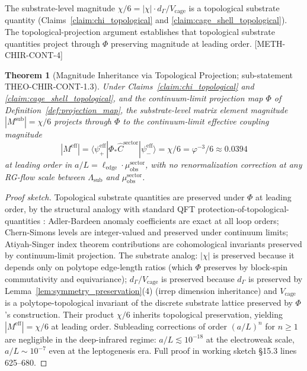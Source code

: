 \documentclass[11pt,letterpaper]{article}
\newtheorem{theorem}{Theorem}[section]
\newcommand{\Phicont}{\Phi_*}
\newcommand{\Lambdasub}{\Lambda_{\text{sub}}}
\newcommand{\muobs}{\mu_{\text{obs}}}
\newcommand{\elledge}{\ell_{\text{edge}}}
\newcommand{\Vcage}{V_{\text{cage}}}
\newcommand{\dGamma}{d_\Gamma}
\newcommand{\methref}[1]{\textsf{\small[\textsc{#1}]}}
\begin{document}
The substrate-level magnitude $\chi/6 = |\chi| \cdot \dGamma/\Vcage$ is a topological substrate quantity (Claims~\ref{claim:chi_topological} and \ref{claim:cage_shell_topological}). The topological-projection argument establishes that topological substrate quantities project through $\Phi$ preserving magnitude at leading order. \methref{METH-CHIR-CONT-4}

\begin{theorem}[Magnitude Inheritance via Topological Projection; sub-statement THEO-CHIR-CONT-1.3]
\label{thm:magnitude_inheritance}
Under Claims~\ref{claim:chi_topological} and \ref{claim:cage_shell_topological}, and the continuum-limit projection map $\Phi$ of Definition~\ref{def:projection_map}, the substrate-level matrix element magnitude $|M^{\text{sub}}| = \chi/6$ projects through $\Phi$ to the continuum-limit effective coupling magnitude
\begin{equation}
|M^{\text{eff}}| = \langle\psi^{\text{eff}}_+|\Phicont\hat{C}^{\text{sector}}|\psi^{\text{eff}}_-\rangle = \chi/6 = \varphi^{-3}/6 \approx 0.0394
\label{eq:magnitude_inheritance}
\end{equation}
at leading order in $a/L = \elledge \cdot \muobs^{\text{sector}}$, with no renormalization correction at any RG-flow scale between $\Lambdasub$ and $\muobs^{\text{sector}}$.
\end{theorem}

\begin{proof}[Proof sketch]
Topological substrate quantities are preserved under $\Phi$ at leading order, by the structural analogy with standard QFT protection-of-topological-quantities \cite{AdlerBardeen, AtiyahSinger, Witten1983CS}: Adler-Bardeen anomaly coefficients are exact at all loop orders; Chern-Simons levels are integer-valued and preserved under continuum limits; Atiyah-Singer index theorem contributions are cohomological invariants preserved by continuum-limit projection. The substrate analog: $|\chi|$ is preserved because it depends only on polytope edge-length ratios (which $\Phi$ preserves by block-spin commutativity and equivariance); $\dGamma/\Vcage$ is preserved because $\dGamma$ is preserved by Lemma~\ref{lem:symmetry_preservation}(4) (irrep dimension inheritance) and $\Vcage$ is a polytope-topological invariant of the discrete substrate lattice preserved by $\Phi$'s construction. Their product $\chi/6$ inherits topological preservation, yielding $|M^{\text{eff}}| = \chi/6$ at leading order. Subleading corrections of order $(a/L)^n$ for $n \geq 1$ are negligible in the deep-infrared regime: $a/L \lesssim 10^{-18}$ at the electroweak scale, $a/L \sim 10^{-7}$ even at the leptogenesis era. Full proof in working sketch \cite{ChiContSketch} §15.3 lines 625--680.
\end{proof}
\end{document}
